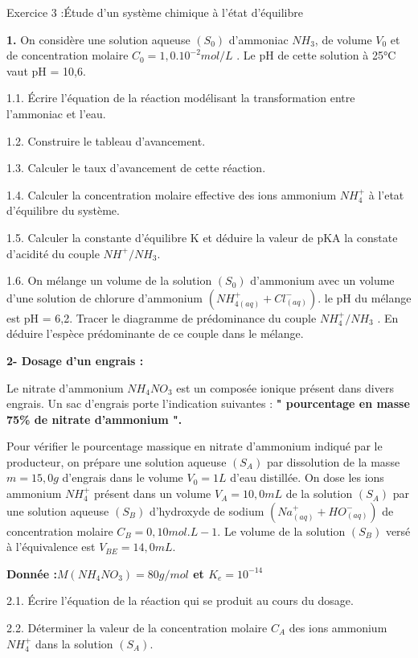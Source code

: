\documentclass[12pt, french]{article}
\begin{document}
\begin{Box2}{Exercice 3 :Étude d’un système chimique à l’état d’équilibre }


	\textbf{1. }On considère une solution aqueuse $(S_0)$ d’ammoniac $NH_3$, de volume $V_0$ et de concentration molaire $C_0 = 1,0 . 10^{-2}mol/L$ . Le pH de cette solution à 25°C vaut pH = 10,6.

	1.1. Écrire l’équation de la réaction modélisant la transformation entre l’ammoniac et l’eau.

	1.2. Construire le tableau d’avancement.

	1.3. Calculer le taux d’avancement de cette réaction.

	1.4. Calculer la concentration molaire effective des ions ammonium $NH^+_4$ à l’etat d’équilibre du système.

	1.5. Calculer la constante d’équilibre K et déduire la valeur de pKA la constate d’acidité du couple $NH^+/NH_3$.
	
	1.6. On mélange un volume de la solution $(S_0)$ d’ammonium avec un volume d’une solution de chlorure d’ammonium $(NH_{4(aq)}^+ + Cl^-_{(aq)})$. le pH du mélange est pH = 6,2. Tracer le diagramme de prédominance du couple    $NH^+_4/NH_3$ . En déduire l’espèce prédominante de ce couple dans le mélange.

	\textbf{2- Dosage d’un engrais : \dotfill}

Le nitrate d’ammonium $NH_4NO_3$ est un composée ionique présent dans divers engrais. Un sac d’engrais porte
l’indication suivantes : \textbf{" pourcentage en masse 75\% de nitrate d’ammonium ".}

Pour vérifier le pourcentage massique en nitrate d’ammonium indiqué par le producteur, on prépare une solution
aqueuse $(S_A)$ par dissolution de la masse $m=15,0g$ d’engrais dans le volume $V_0 = 1L$ d’eau distillée. On dose les ions
ammonium $NH_4^+$ présent dans un volume $V_A = 10,0 mL$ de la solution $(S_A)$ par une solution aqueuse $(S_B)$ d’hydroxyde de sodium $ (Na^+_{(aq)} +  HO^-_{(aq)})$ de concentration molaire $C_B = 0,10 mol.L-1$. Le volume de la solution $(S_B)$ versé à l’équivalence est $V_{BE} = 14,0mL$.

\textbf{Donnée :$M(NH_4NO_3) = 80 g/mol$ et $K_e = 10^{-14}$}

2.1. Écrire l’équation de la réaction qui se produit au cours du dosage.

2.2. Déterminer la valeur de la concentration molaire $C_A$ des ions ammonium $NH_4^+$ dans la solution $(S_A)$.


\end{Box2}
\end{document}
